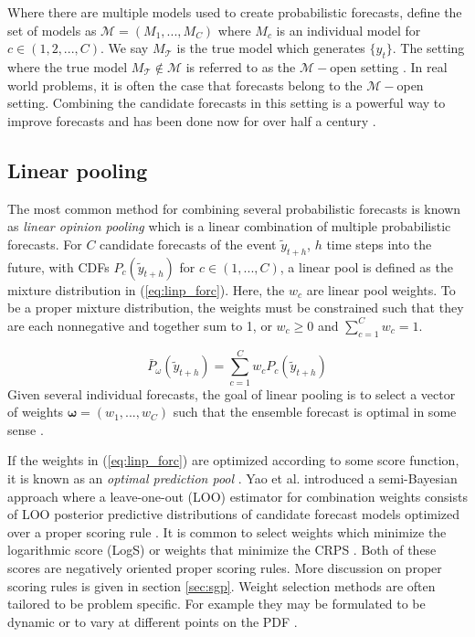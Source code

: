 Where there are multiple models used to create 
probabilistic forecasts, define the set of models as 
$\mathcal{M} = (M_1, ..., M_C)$ where $M_c$ is an individual model for 
$c \in (1,2,...,C)$. We say $M_{\mathcal{T}}$ is the true model which generates 
$\{y_t\}$. The setting where the true model 
$M_{\mathcal{T}} \notin \mathcal{M}$ is referred to as the $\mathcal{M}-$open 
setting \cite[]{yao2018using,bernardo1994bayesian}. In real world problems, it 
is often the case that forecasts belong to the $\mathcal{M}-$open setting. 
Combining the candidate forecasts in this setting is a 
powerful way to improve forecasts and has been done now for over half a 
century \cite[]{wang2023forecast}. 

\subsection{Linear pooling}
The most common method for combining several probabilistic forecasts is known 
as \textit{linear opinion pooling} which is a linear combination of multiple 
probabilistic forecasts. For $C$ candidate forecasts of the event 
$\tilde{y}_{t+h}$, $h$ time steps into the future, %
with CDFs $P_{c}(\tilde{y}_{t + h})$ for $c \in (1,...,C)$, a linear pool 
is defined as the mixture distribution in 
(\ref{eq:linp_forc}). Here, the $w_c$ are linear pool weights. 
To be a proper mixture distribution, the weights must 
be constrained such that they are each nonnegative and together sum to 1, or 
$w_c \geq 0$ and $\sum_{c = 1}^C w_c = 1$.

\begin{equation}
 \label{eq:linp_forc}
 \bar{P}_{\omega}(\tilde{y}_{t + h}) = \sum_{c = 1}^C w_c P_c(\tilde{y}_{t + h})
\end{equation}
Given several individual forecasts, the goal of linear pooling is to
select a vector of weights 
$\boldsymbol{\omega} = (w_1, ..., w_C)$ such that the ensemble forecast is
optimal in some sense
\cite[]{wang2023forecast,stone1961opinion}. 

If the weights in (\ref{eq:linp_forc}) are optimized according to some score 
function, it is known as an 
\textit{optimal prediction pool} \cite[]{geweke2011optimal,hall2007combining}. 
Yao et al. \cite{yao2018using} introduced a semi-Bayesian approach where a 
leave-one-out 
(LOO) estimator for combination weights consists of LOO posterior predictive 
distributions of candidate forecast models optimized over a proper scoring 
rule \cite[]{gneiting2007strictly}. It is common to select weights which 
minimize the logarithmic score (LogS) \cite[]{li2023bayesian,yao2018using,
geweke2011optimal,hall2007combining} or weights that minimize the CRPS
\cite[]{berrisch2023crps,li2019combining,
thorey2017online}. Both of these scores are negatively oriented proper 
scoring rules. 
More discussion on proper scoring rules is given in section \ref{sec:sgp}. 
Weight selection methods are often tailored to be problem specific. For 
example they may be formulated to be dynamic \cite[]{li2023bayesian,
billio2013time} or to vary at different points on the PDF 
\cite[]{berrisch2023crps}.


